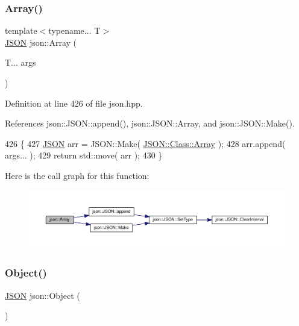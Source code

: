 \subsubsection{\texorpdfstring{Array()}{Array()}\hspace{0.1cm}{\footnotesize\ttfamily [2/2]}}
{\footnotesize\ttfamily template$<$typename... T$>$ \\
\mbox{\hyperlink{classjson_1_1_j_s_o_n}{J\+S\+ON}} json\+::\+Array (\begin{DoxyParamCaption}\item[{T...}]{args }\end{DoxyParamCaption})}



Definition at line 426 of file json.\+hpp.



References json\+::\+J\+S\+O\+N\+::append(), json\+::\+J\+S\+O\+N\+::\+Array, and json\+::\+J\+S\+O\+N\+::\+Make().


\begin{DoxyCode}
426                         \{
427     \mbox{\hyperlink{class_j_s_o_n}{JSON}} arr = JSON::Make( \mbox{\hyperlink{namespacejson_a8c39b1bf99577bc140f0647d0192219f}{JSON::Class::Array}} );
428     arr.append( args... );
429     \textcolor{keywordflow}{return} std::move( arr );
430 \}
\end{DoxyCode}
Here is the call graph for this function\+:
\nopagebreak
\begin{figure}[H]
\begin{center}
\leavevmode
\includegraphics[width=350pt]{namespacejson_a8c39b1bf99577bc140f0647d0192219f_cgraph}
\end{center}
\end{figure}
\mbox{\label{namespacejson_a7bc7d25f21c18a652a42db29cfdabd06}} 
\subsubsection{\texorpdfstring{Object()}{Object()}}
{\footnotesize\ttfamily \mbox{\hyperlink{classjson_1_1_j_s_o_n}{J\+S\+ON}} json\+::\+Object (\begin{DoxyParamCaption}{ }\end{DoxyParamCaption})\hspace{0.3cm}{\ttfamily [inline]}}




